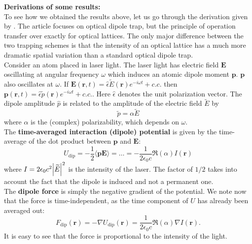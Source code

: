 \documentclass{book}
\theoremstyle{definition}
\newcommand{\al}{\alpha}
\newcommand{\f}[2]{\frac{#1}{#2}}
\begin{document}
\begin{framed}
	\noindent \textbf{Derivations of some results:}\\
	
	\noindent To see how we obtained the results above, let us go through the derivation given by \cite{grimm2000optical}. The article focuses on optical dipole trap, but the principle of operation transfer over exactly for optical lattices. The only major difference between the two trapping schemes is that the intensity of an optical lattice has a much more dramatic spatial variation than a standard optical dipole trap.\\
	
	Consider an atom placed in laser light. The laser light has electric field $\mathbf{E}$ oscillating at angular frequency $\omega$ which induces an atomic dipole moment $\mathbf{p}$. $\mathbf{p}$ also oscillates at $\omega$. If $\mathbf{E}(\mathbf{r},t) = \widehat{\epsilon} \widetilde{E}(\mathbf{r}) e^{-i\omega t} + c.c.$ then $\mathbf{\mathbf{p}}(\mathbf{r},t)  = \widehat{\epsilon} \widetilde{p}(\mathbf{r}) e^{-i\omega t} + c.c.$. Here $\widehat{\epsilon}$ denotes the unit polarization vector. The dipole amplitude $\widehat{p}$ is related to the amplitude of the electric field $\widetilde{E}$ by 
	\begin{equation*}
	\widetilde{p} = \al \widetilde{E}
	\end{equation*}
	where $\al$ is the (complex) polarizability, which depends on $\omega$. \\
	
	
	The \textbf{time-averaged interaction (dipole) potential} is given by the time-average of the dot product between $\mathbf{p}$ and $\mathbf{E}$:
	\begin{equation*}
	U_\text{dip} = -\f{1}{2} \langle \mathbf{p} \mathbf{E} \rangle = \dots = -\f{1}{2\epsilon_0 c} \Re(\al) I(\mathbf{r})
	\end{equation*}
	where $I = 2\epsilon_0 c^2 \abs{\widetilde{E}}^2$ is the intensity of the laser. The factor of $1/2$ takes into account the fact that the dipole is induced and not a permanent one. \\
	
	
	The \textbf{dipole force} is simply the negative gradient of the potential. We note now that the force is time-independent, as the time component of $U$ has already been averaged out:
	\begin{equation*}
	F_\text{dip}(\mathbf{r}) = -\nabla U_\text{dip}(\mathbf{r}) = \f{1}{2\epsilon_0 c}\Re(\al) \nabla I(\mathbf{r}). 
	\end{equation*}
	It is easy to see that the force is proportional to the intensity of the light. \\
	

\end{framed}
\end{document}
